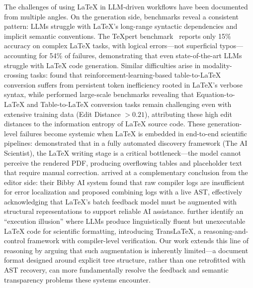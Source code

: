 The challenges of using \LaTeX{} in LLM-driven workflows have been documented from multiple angles. On the generation side, benchmarks reveal a consistent pattern: LLMs struggle with \LaTeX{}'s long-range syntactic dependencies and implicit semantic conventions. The TeXpert benchmark~\cite{kale2025texpert} reports only 15\% accuracy on complex \LaTeX{} tasks, with logical errors---not superficial typos---accounting for 54\% of failures, demonstrating that even state-of-the-art LLMs struggle with \LaTeX{} code generation. Similar difficulties arise in modality-crossing tasks: \citet{ling_table2latex_2025} found that reinforcement-learning-based table-to-\LaTeX{} conversion suffers from persistent token inefficiency rooted in \LaTeX{}'s verbose syntax, while \citet{xia2024docgenome} performed large-scale benchmarks revealing that Equation-to-\LaTeX{} and Table-to-\LaTeX{} conversion tasks remain challenging even with extensive training data (Edit Distance $> 0.21$), attributing these high edit distances to the information entropy of \LaTeX{} source code. These generation-level failures become systemic when \LaTeX{} is embedded in end-to-end scientific pipelines: \citet{lu2024aiscientist} demonstrated that in a fully automated discovery framework (The AI Scientist), the \LaTeX{} writing stage is a critical bottleneck---the model cannot perceive the rendered PDF, producing overflowing tables and placeholder text that require manual correction. \citet{jain2026bibby} arrived at a complementary conclusion from the editor side: their Bibby AI system found that raw compiler logs are insufficient for error localization and proposed combining logs with a live AST, effectively acknowledging that \LaTeX{}'s batch feedback model must be augmented with structural representations to support reliable AI assistance. \citet{lyn2025translatex} further identify an ``execution illusion'' where LLMs produce linguistically fluent but unexecutable \LaTeX{} code for scientific formatting, introducing TransLaTeX, a reasoning-and-control framework with compiler-level verification. Our work extends this line of reasoning by arguing that such augmentation is inherently limited---a document format designed around explicit tree structure, rather than one retrofitted with AST recovery, can more fundamentally resolve the feedback and semantic transparency problems these systems encounter.

